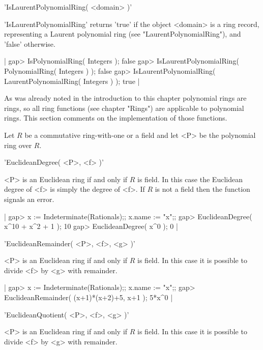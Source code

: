
'IsLaurentPolynomialRing( <domain> )'

'IsLaurentPolynomialRing' returns 'true' if the object <domain> is a ring
record,    representing     a    Laurent     polynomial     ring     (see
"LaurentPolynomialRing"), and 'false' otherwise.
    
|    gap> IsPolynomialRing( Integers );                  
    false
    gap> IsLaurentPolynomialRing( PolynomialRing( Integers ) );
    false
    gap> IsLaurentPolynomialRing( LaurentPolynomialRing( Integers ) );
    true |



As was already noted in the introduction to this chapter polynomial rings
are rings, so all ring functions (see chapter "Rings") are  applicable to
polynomial rings.  This section comments on the implementation  of  those
functions.

Let $R$ be  a  commutative ring-with-one or  a field and  let <P>  be the
polynomial ring over $R$.

\vspace{5mm}
'EuclideanDegree( <P>, <f> )'%

<P> is an Euclidean ring if  and only if $R$  is field. In this case  the
Euclidean  degree  of <f> is simply the degree  of  <f>.  If $R$ is not a
field then the function signals an error.

|    gap> x := Indeterminate(Rationals);; x.name := "x";;
    gap> EuclideanDegree( x^10 + x^2 + 1 );
    10
    gap> EuclideanDegree( x^0 );
    0 |

\vspace{5mm}
'EuclideanRemainder( <P>, <f>, <g> )'%

<P> is an Euclidean ring if and only if $R$  is field. In this case it is
possible to divide <f> by <g> with remainder.

|    gap> x := Indeterminate(Rationals);; x.name := "x";;
    gap> EuclideanRemainder( (x+1)*(x+2)+5, x+1 );
    5*x^0 |

\vspace{5mm}
'EuclideanQuotient( <P>, <f>, <g> )'%

<P> is an Euclidean ring if and only if $R$  is field. In this case it is
possible to divide <f> by <g> with remainder.

